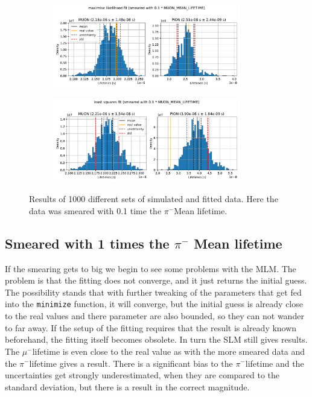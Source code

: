 \documentclass[11pt, a4paper, oneside]{book}
\newcommand\DoublePlotwidth{0.9}
\newcommand{\pion}{$\pi^{-}$}
\newcommand{\muon}{$\mu^{-}$}
\begin{document}
\begin{figure}[h]
\begin{subfigure}{\textwidth}
  \centering
  \includegraphics[width=\DoublePlotwidth\textwidth]{images/4b_hist_1_likelihood.pdf}
\end{subfigure}

\begin{subfigure}{\textwidth}
  \centering
  \includegraphics[width=\DoublePlotwidth\textwidth]{images/4b_hist_1_squares.pdf}
\end{subfigure}
\caption{Results of 1000 different sets of simulated and fitted data. Here the data was smeared with 0.1 time the \pion Mean lifetime.}
\label{fig:results_smeared_1}
\end{figure}

\FloatBarrier
\subsection{Smeared with 1 times the \texorpdfstring{\pion}{pion} Mean lifetime}

If the smearing gets to big we begin to see some problems with the MLM. The problem is that the fitting does not converge, and it just returns the initial guess. The possibility stands that with further tweaking of the parameters that get fed into the \lstinline{minimize} function, it will converge, but the initial guess is already close to the real values and there parameter are also bounded, so they can not wander to far away. If the setup of the fitting requires that the result is already known beforehand, the fitting itself becomes obsolete. In turn the SLM still gives results. The \muon lifetime is even close to the real value as with the more smeared data and the \pion lifetime gives a result. There is a significant bias to the \pion lifetime and the uncertainties get strongly underestimated, when they are compared to the standard deviation, but there is a result in the correct magnitude.
\end{document}

